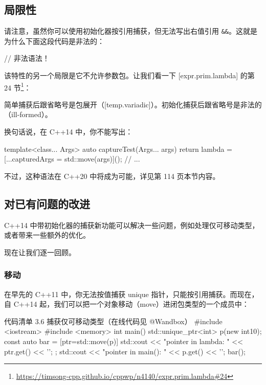 \subsection{局限性}

请注意，虽然你可以使用初始化器按引用捕获，但无法写出右值引用 \texttt{\&\&}。这就是为什么下面这段代码是非法的：

\begin{codebox}
[&&z = x] // 非法语法！
\end{codebox}

该特性的另一个局限是它不允许参数包。让我们看一下 [expr.prim.lambda] 的第 24 节\footnote{\url{https://timsong-cpp.github.io/cppwp/n4140/expr.prim.lambda\#24}}：

简单捕获后跟省略号是包展开（[temp.variadic]）。初始化捕获后跟省略号是非法的（ill-formed）。

换句话说，在 C++14 中，你不能写出：

\begin{codebox}
template<class... Args>
auto captureTest(Args... args) {
return lambda = [...capturedArgs = std::move(args)](){};
// ...
}
\end{codebox}

不过，这种语法在 C++20 中将成为可能，详见第 114 页本节内容。

\subsection{对已有问题的改进}

C++14 中带初始化器的捕获新功能可以解决一些问题，例如处理仅可移动类型，或者带来一些额外的优化。

现在让我们逐一回顾。

\subsubsection{移动}

在早先的 C++11 中，你无法按值捕获 unique 指针，只能按引用捕获。而现在，自 C++14 起，我们可以把一个对象移动（move）进闭包类型的一个成员中：

\begin{codeboxt}{代码清单 3.6 捕获仅可移动类型（在线代码见 @Wandbox）}
#include <iostream>
#include <memory>
int main(){
std::unique_ptr<int> p(new int{10});
const auto bar = [ptr=std::move(p)] {
std::cout << "pointer in lambda: " << ptr.get() << '\n';
};
std::cout << "pointer in main(): " << p.get() << '\n';
bar();
}
\end{codeboxt}

